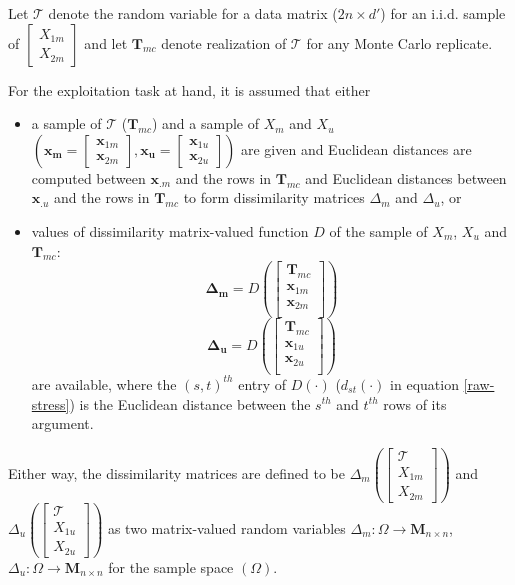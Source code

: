 \documentclass[11pt]{article} %
\begin{document}
Let $\mathcal{T}$ denote  the random variable for a data matrix ($2n\times d'$) for an  i.i.d. sample of  
$\left[ \begin{array}{c}
X_{1m}\\
X_{2m}
\end{array}
\right]$ and let  $\mathbf{T}_{mc}$  denote realization of $\mathcal{T}$ for any Monte Carlo replicate.


For the exploitation task at hand, it is assumed that either
\begin{itemize}
\item   a sample of $\mathcal{T}$ ($\mathbf{T}_{mc}$) and a sample of $X_m$ and  $X_u$ 
$\left(\bm{x_m}=\left[
 \begin{array}{c}
\bm{x}_{1m}\\
\bm{x}_{2m}
\end{array}
\right] ,\bm{x_u}=\left[
 \begin{array}{c}
 \bm{x}_{1u}\\
 \bm{x}_{2u} 
\end{array}
\right]\right)$ are given
 and  Euclidean distances are computed between  $\bm{x}_{.m}$ and the rows in  $\mathbf{T}_{mc}$  and Euclidean distances between  $\bm{x}_{.u}$ and the rows in  $\mathbf{T}_{mc}$ to form  dissimilarity matrices $\Delta_m$ and $\Delta_u$, or
\item  values of  dissimilarity matrix-valued function $D$ of  the sample of $X_m$, $X_u$ and $\mathbf{T}_{mc}$: $$
\mathbf{\Delta_m} = D \left( \left[
 \begin{array}{c}
\mathbf{T}_{mc}  \\
\bm{x}_{1m}\\
\bm{x}_{2m}\\
\end{array}
\right]
\right)
$$
$$
\mathbf{\Delta_u}=D \left( \left[
 \begin{array}{c}
\mathbf{T}_{mc}  \\
\bm{x}_{1u}\\
\bm{x}_{2u}\\
\end{array}
\right]
\right)
$$ are available,
where the  $(s,t)^{th}$ entry of $D(\cdot)$   ($d_{st}(\cdot)$ in equation \eqref{raw-stress})  is the Euclidean distance between the $s^{th}$ and $t^{th}$ rows of its argument.
\end{itemize}

Either way,  the dissimilarity matrices are defined to be $\Delta_{m} \left(\left[
\begin{array}{c}
\mathcal{T} \\
X_{1m} \\
X_{2m} 
\end {array}
\right]
\right)$  and 
 $\Delta_{u} \left(\left[
\begin{array}{c}
\mathcal{T}\\
X_{1u} \\
X_{2u}
\end {array}
\right]\right)$ as two matrix-valued random variables $\Delta_{m}:\Omega \rightarrow \mathbf{M}_{n\times n} $,$\Delta_{u}:\Omega \rightarrow \mathbf{M}_{n\times n} $  for the sample  space $(\Omega)$.
\end{document}
